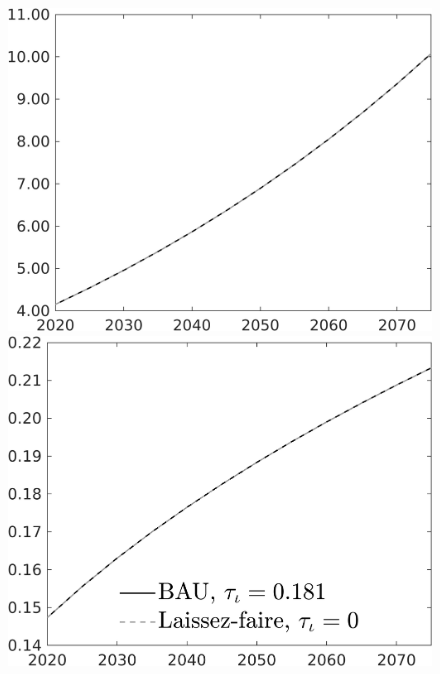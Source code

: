 \documentclass[12pt]{article}
\begin{document}
\begin{figure}[h!!]
\begin{minipage}[]{0.32\textwidth}
	\end{minipage}	
	\begin{minipage}[]{0.32\textwidth}
		\includegraphics[width=1\textwidth]{../../codding_model/own_basedOnFried/optimalPol_010922_revision/figures/all_13Sept22/CompTaul_LFBAU_Reg0_wh_spillover0_nsk1_xgr0_knspil0_sep1_countec0_GovRev0_etaa0.79_lgd0.png}
	\end{minipage}	
	\begin{minipage}[]{0.32\textwidth}
		\includegraphics[width=1\textwidth]{../../codding_model/own_basedOnFried/optimalPol_010922_revision/figures/all_13Sept22/CompTaul_LFBAU_Reg0_GFF_spillover0_nsk1_xgr0_knspil0_sep1_countec0_GovRev0_etaa0.79_lgd1.png}

\end{minipage}
\end{figure}
\end{document}
